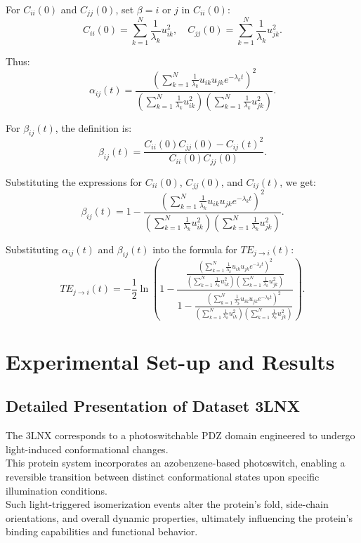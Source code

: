 \documentclass[English, Lau, oneside]{sapthesis}
\begin{document}
For \(C_{ii}(0)\) and \(C_{jj}(0)\), set \(\beta = i\) or \(j\) in \(C_{ii}(0)\):
\[
C_{ii}(0) = \sum_{k=1}^N \frac{1}{\lambda_k} u_{ik}^2, \quad
C_{jj}(0) = \sum_{k=1}^N \frac{1}{\lambda_k} u_{jk}^2.
\]

Thus:
\[
\alpha_{ij}(t) = \frac{\left(\sum_{k=1}^N \frac{1}{\lambda_k} u_{ik} u_{jk} e^{-\lambda_k t}\right)^2}
{\left(\sum_{k=1}^N \frac{1}{\lambda_k} u_{ik}^2\right)\left(\sum_{k=1}^N \frac{1}{\lambda_k} u_{jk}^2\right)}.
\]

For \(\beta_{ij}(t)\), the definition is:
\[
\beta_{ij}(t) = \frac{C_{ii}(0) C_{jj}(0) - C_{ij}(t)^2}{C_{ii}(0) C_{jj}(0)}.
\]

Substituting the expressions for \(C_{ii}(0)\), \(C_{jj}(0)\), and \(C_{ij}(t)\), we get:
\[
\beta_{ij}(t) = 1 - \frac{\left(\sum_{k=1}^N \frac{1}{\lambda_k} u_{ik} u_{jk} e^{-\lambda_k t}\right)^2}
{\left(\sum_{k=1}^N \frac{1}{\lambda_k} u_{ik}^2\right)\left(\sum_{k=1}^N \frac{1}{\lambda_k} u_{jk}^2\right)}.
\]

Substituting \(\alpha_{ij}(t)\) and \(\beta_{ij}(t)\) into the formula for \(TE_{j \to i}(t)\):
\[
TE_{j \to i}(t) = -\frac{1}{2} \ln{\left(1 - \frac{\frac{\left(\sum_{k=1}^N \frac{1}{\lambda_k} u_{ik} u_{jk} e^{-\lambda_k t}\right)^2}
{\left(\sum_{k=1}^N \frac{1}{\lambda_k} u_{ik}^2\right)\left(\sum_{k=1}^N \frac{1}{\lambda_k} u_{jk}^2\right)}}
{1 - \frac{\left(\sum_{k=1}^N \frac{1}{\lambda_k} u_{ik} u_{jk} e^{-\lambda_k t}\right)^2}
{\left(\sum_{k=1}^N \frac{1}{\lambda_k} u_{ik}^2\right)\left(\sum_{k=1}^N \frac{1}{\lambda_k} u_{jk}^2\right)}}\right)}.
\]


\chapter{Experimental Set-up and Results}
\section{Detailed Presentation of Dataset 3LNX}

\noindent The 3LNX corresponds to a photoswitchable PDZ domain engineered to undergo light-induced conformational changes.\\
This protein system incorporates an azobenzene-based photoswitch, enabling a reversible transition between distinct conformational states upon specific illumination conditions. \\
Such light-triggered isomerization events alter the protein’s fold, side-chain orientations, and overall dynamic properties, ultimately influencing the protein’s binding capabilities and functional behavior.
\end{document}

